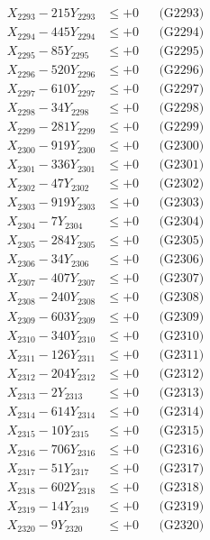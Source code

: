 \documentclass[a4paper,10pt]{article}
\begin{document}
{\begin{align}
X_{2293} - 215Y_{2293} &\leq +0 && \text{(G2293)} \\
X_{2294} - 445Y_{2294} &\leq +0 && \text{(G2294)} \\
X_{2295} - 85Y_{2295} &\leq +0 && \text{(G2295)} \\
X_{2296} - 520Y_{2296} &\leq +0 && \text{(G2296)} \\
X_{2297} - 610Y_{2297} &\leq +0 && \text{(G2297)} \\
X_{2298} - 34Y_{2298} &\leq +0 && \text{(G2298)} \\
X_{2299} - 281Y_{2299} &\leq +0 && \text{(G2299)} \\
X_{2300} - 919Y_{2300} &\leq +0 && \text{(G2300)} \\
\allowbreak
X_{2301} - 336Y_{2301} &\leq +0 && \text{(G2301)} \\
X_{2302} - 47Y_{2302} &\leq +0 && \text{(G2302)} \\
X_{2303} - 919Y_{2303} &\leq +0 && \text{(G2303)} \\
X_{2304} - 7Y_{2304} &\leq +0 && \text{(G2304)} \\
X_{2305} - 284Y_{2305} &\leq +0 && \text{(G2305)} \\
X_{2306} - 34Y_{2306} &\leq +0 && \text{(G2306)} \\
X_{2307} - 407Y_{2307} &\leq +0 && \text{(G2307)} \\
X_{2308} - 240Y_{2308} &\leq +0 && \text{(G2308)} \\
X_{2309} - 603Y_{2309} &\leq +0 && \text{(G2309)} \\
X_{2310} - 340Y_{2310} &\leq +0 && \text{(G2310)} \\
\allowbreak
X_{2311} - 126Y_{2311} &\leq +0 && \text{(G2311)} \\
X_{2312} - 204Y_{2312} &\leq +0 && \text{(G2312)} \\
X_{2313} - 2Y_{2313} &\leq +0 && \text{(G2313)} \\
X_{2314} - 614Y_{2314} &\leq +0 && \text{(G2314)} \\
X_{2315} - 10Y_{2315} &\leq +0 && \text{(G2315)} \\
X_{2316} - 706Y_{2316} &\leq +0 && \text{(G2316)} \\
X_{2317} - 51Y_{2317} &\leq +0 && \text{(G2317)} \\
X_{2318} - 602Y_{2318} &\leq +0 && \text{(G2318)} \\
X_{2319} - 14Y_{2319} &\leq +0 && \text{(G2319)} \\
X_{2320} - 9Y_{2320} &\leq +0 && \text{(G2320)} \\

\end{align}}
\end{document}
